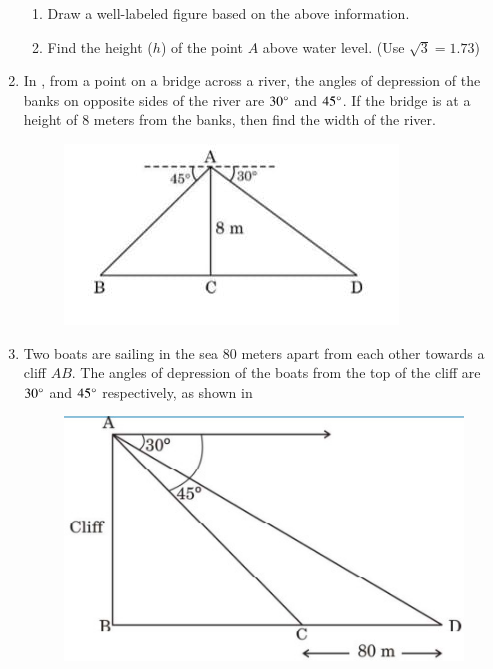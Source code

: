 \begin{enumerate}[label=\thesubsection.\arabic*.,ref=\thesubsection.\theenumi]
\begin{enumerate}
        \item Draw a well-labeled figure based on the above information.
        \item Find the height ($h$) of the point $A$ above water level. (Use $\sqrt{3}=1.73$) 
    \end{enumerate}
%
    \hfill{}\item In , from a point on a bridge across a river, the angles of depression of the banks on opposite sides of the river are $30\degree$ and $45\degree$. If the bridge is at a height of $8$ meters from the banks, then find the width of the river.
    \begin{figure}[H]
        \centering
        \includegraphics[width=\columnwidth]{cbse/figs/su.jpeg}
        \caption{}
        \label{fig:su.jpeg}
    \end{figure}
    \hfill{}
    \item Two boats are sailing in the sea $80$ meters apart from each other towards a cliff $AB$. The angles of depression of the boats from the top of the cliff are $30\degree$ and $45\degree$ respectively, as shown in 
%
    \begin{figure}[H]
        \centering
        \includegraphics[width=\columnwidth]{cbse/figs/boat.edit.jpeg}

\end{figure}
\end{enumerate}
